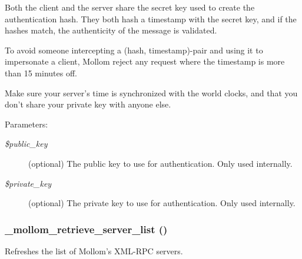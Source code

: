 Both the client and the server share the secret key used to create the authentication hash. They both hash a timestamp with the secret key, and if the hashes match, the authenticity of the message is validated.

To avoid someone intercepting a (hash, timestamp)-pair and using it to impersonate a client, Mollom reject any request where the timestamp is more than 15 minutes off.

Make sure your server's time is synchronized with the world clocks, and that you don't share your private key with anyone else.

\begin{Desc}
\item[Parameters:]
\begin{description}
\item[{\em \$public\_\-key}](optional) The public key to use for authentication. Only used internally. \item[{\em \$private\_\-key}](optional) The private key to use for authentication. Only used internally. \end{description}
\end{Desc}
\hypertarget{mollom_8inc_bbc5f0df68f47e7a174c955e127c7489}{
\subsubsection[{\_\-mollom\_\-retrieve\_\-server\_\-list}]{\setlength{\rightskip}{0pt plus 5cm}\_\-mollom\_\-retrieve\_\-server\_\-list ()}}
\label{mollom_8inc_bbc5f0df68f47e7a174c955e127c7489}


Refreshes the list of Mollom's XML-RPC servers. 
